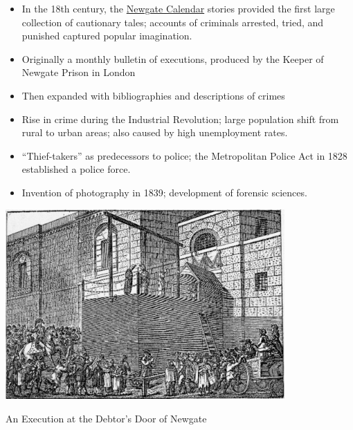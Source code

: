 \documentclass[a4paper,landscape,headrule,footrule,xetex]{foils}
\begin{document}
\begin{itemize}
\item In the 18th century, the \href{http://www.exclassics.com/newgate/ngintro.htm}{Newgate Calendar} stories provided the
  first large collection of cautionary tales; accounts of criminals
  arrested, tried, and punished captured popular imagination.   
\item Originally a monthly bulletin of executions, produced by the
  Keeper of Newgate Prison in London
\item Then expanded with bibliographies and descriptions of crimes
\item Rise in crime during the Industrial Revolution; large population shift from rural to urban areas; also caused by high unemployment rates.       
  \item “Thief-takers” as predecessors to police; the Metropolitan Police Act in 1828 established a police force.        
  \item Invention of photography in 1839; development of forensic sciences. 
  \end{itemize}
\newpage

\begin{center}
  \includegraphics[width=0.8\textwidth]{pics/newgate4}

  An Execution at the Debtor's Door of Newgate
\end{center}
\end{document}
